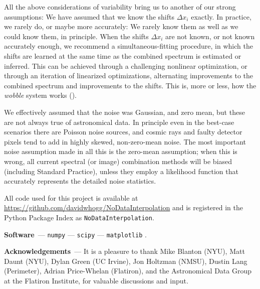 \documentclass[modern]{aastex631}
\renewcommand{\paragraph}[1]{\medskip\par\noindent\textbf{#1}~---}
\begin{document}
All the above considerations of variability bring us to another of our strong assumptions:
We have assumed that we know the shifts $\Delta x_i$ exactly.
In practice, we rarely do, or maybe more accurately: We rarely know them as well as we could know them, in principle.
When the shifts $\Delta x_i$ are not known, or not known accurately enough, we recommend a simultaneous-fitting procedure, in which the shifts are learned at the same time as the combined spectrum is estimated or inferred.
This can be achieved through a challenging nonlinear optimization, or through an iteration of linearized optimizations, alternating improvements to the combined spectrum and improvements to the shifts.
This is, more or less, how the \textsl{wobble} system works (\citealt{wobble}).

We effectively assumed that the noise was Gaussian, and zero mean, but these are not always true of astronomical data.
In principle even in the best-case scenarios there are Poisson noise sources, and cosmic rays and faulty detector pixels tend to add in highly skewed, non-zero-mean noise.
The most important noise assumption made in all this is the zero-mean assumption; when this is wrong, all current spectral (or image) combination methods will be biased (including Standard Practice), unless they employ a likelihood function that accurately represents the detailed noise statistics.

All code used for this project is available at \url{https://github.com/davidwhogg/NoDataInterpolation} and is registered in the Python Package Index as \texttt{NoDataInterpolation}.

\paragraph{Software}
\texttt{numpy} \citep{numpy} ---
\texttt{scipy} \citep{scipy} ---
\texttt{matplotlib} \citep{matplotlib}.

\paragraph{Acknowledgements}
It is a pleasure to thank
Mike Blanton (NYU),
Matt Daunt (NYU),
Dylan Green (UC Irvine),
Jon Holtzman (NMSU), 
Dustin Lang (Perimeter),
Adrian Price-Whelan (Flatiron),
and the Astronomical Data Group at the Flatiron Institute,
for valuable discussions and input.
\end{document}

